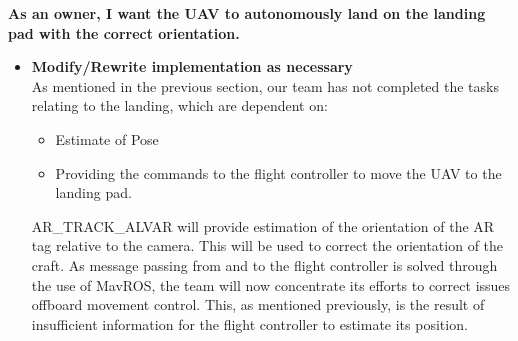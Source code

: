 \vspace{3mm}
\noindent \large{\textbf{As an owner, I want the UAV to autonomously land on the landing pad with the correct orientation.}}
\normalsize
\begin{itemize}
\item \textbf{Modify/Rewrite implementation as necessary}\\
As mentioned in the previous section, our team has not completed the tasks relating to the landing, which are dependent on:
\begin{itemize}
\item Estimate of Pose
\item Providing the commands to the flight controller to move the UAV to the landing pad.
\end{itemize}
AR\_TRACK\_ALVAR will provide estimation of the orientation of the AR tag relative to the camera. This will be used to correct the orientation of the craft. As message passing from and to the flight controller is solved through the use of MavROS, the team will now concentrate its efforts to correct issues offboard movement control. This, as mentioned previously, is the result of insufficient information for the flight controller to estimate its position.
\end{itemize}

